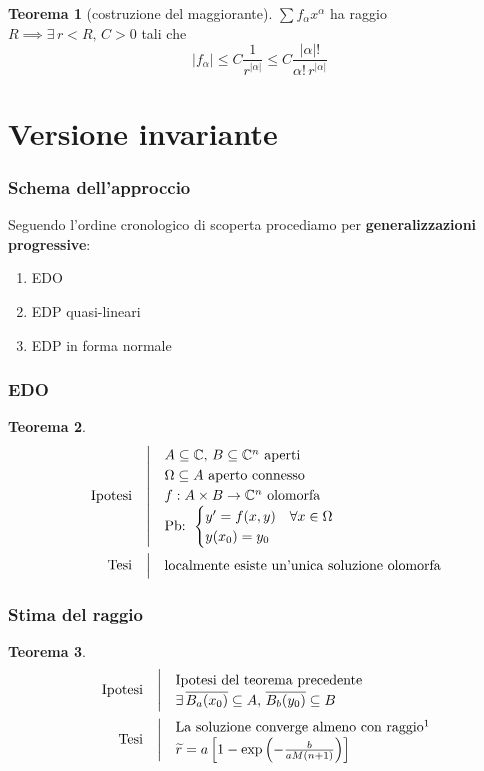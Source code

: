 \documentclass[serif,notheorems]{beamer}
\makeatletter
\newenvironment{ipotesi}%
{\quad\left|\quad\def\arraystretch{1.2}\begin{array}{@{}l@{}}}%
{\end{array}\right.}
\newcommand{\hpth}[2]
{
\begin{align*}
\quad
\text{Ipotesi}
&\begin{ipotesi}
#1
\end{ipotesi}\\
\text{Tesi}
&\begin{ipotesi}
#2
\end{ipotesi}
\end{align*}
}
\theoremstyle{definition} %
\newtheorem{theorem}{Teorema}[section] %
\theoremstyle{remark}
\makeatother
\begin{document}
\begin{frame}
\begin{theorem}[costruzione del maggiorante]
$\sum f_\alpha x^\alpha$ ha raggio $R \implies \exists \, r<R, \, C>0$ tali che 
$$|f_\alpha | \leq C \frac{1}{r^{|\alpha |}} \leq C \frac{|\alpha |!}{\alpha ! \, r^{|\alpha |}}$$
\end{theorem}
\end{frame}


\section{Versione invariante}

\begin{frame}
\frametitle{Schema dell'approccio}
Seguendo l'ordine cronologico di scoperta procediamo per \textbf{generalizzazioni progressive}:
\begin{enumerate}
\item EDO
\item EDP quasi-lineari
\item EDP in forma normale
\end{enumerate}
\end{frame}


\begin{frame}
\frametitle{EDO}
\begin{theorem}
\hpth{
A \subseteq \mathbb{C}, \, B\subseteq \mathbb{C}^n \text{ aperti }\\
\Omega \subseteq A \text{ aperto connesso}\\
f:A\times B\rightarrow\mathbb{C}^n \text{ olomorfa}\\
\text{Pb: }
\begin{cases}
y' = f(x,y) \quad \forall x \in \Omega \\
y(x_0)=y_0
\end{cases}\\
}
{
\text{localmente esiste un'unica soluzione olomorfa}
}
\end{theorem}
\end{frame}

\begin{frame}
\frametitle{Stima del raggio}
\begin{theorem}
\hpth{
\text{Ipotesi del teorema precedente}\\
\exists \, \overline{B_a(x_0)}\subseteq A,\,\overline{B_b(y_0)} \subseteq B\\
}{
\text{La soluzione converge almeno con raggio}\footnotemark \\
\widetilde{r}= a\left[ 1-\exp\left( -\frac{b}{aM(n+1)}\right) \right] \\
}
\end{theorem}
\end{frame}
\end{document}
